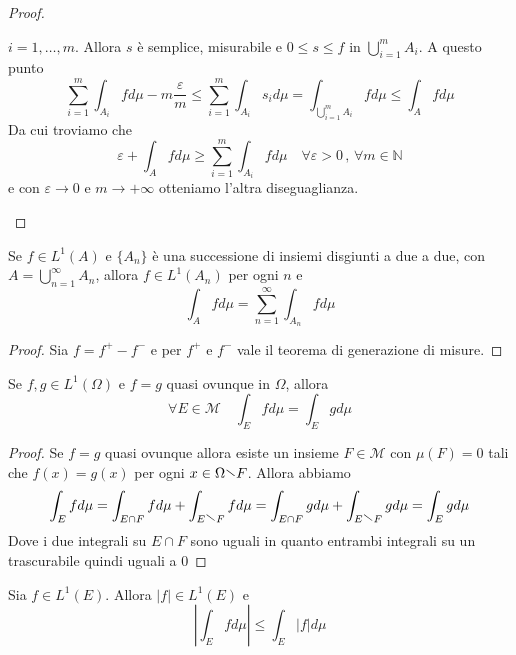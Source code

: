 \begin{proof}
\begin{enumerate}[label = \arabic*.]
            \(i = 1, \dots, m\). Allora \(s\) è semplice, misurabile e \(0 \le s
            \le f\) in \(\bigcup_{i=1}^{m} A_{i} \). A questo punto
            \[
                \sum_{i=1}^{m} \int_{A_{i}} f d\mu  - m \frac{\varepsilon}{m}
                \le   \sum_{i=1}^m \int_{A_{i}} s_{i} d\mu =
                \int_{\bigcup_{i=1}^{m} A_{i} } f d\mu \le \int_{A} f d\mu
            \]
            Da cui troviamo che 
            \[
                \varepsilon + \int_{A} f d\mu \ge \sum_{i=1}^{m} \int_{A_{i}} f
                d\mu \quad \forall \varepsilon >0 \,,\, \forall m \in \mathbb{N}
            \]
            e con \(\varepsilon \to 0 \) e \(m \to +\infty\) otteniamo l'altra
            diseguaglianza.
    \end{enumerate}
\end{proof}
\begin{corollary}
    Se \(f \in L^{1}(A)\) e \(\{A_{n}\}\) è una successione di insiemi
    disgiunti a due a due, con \(A = \bigcup_{n=1}^{\infty} A_{n} \), allora \(f
    \in L^{1}(A_n)\) per ogni \(n\) e
    \[
        \int_{A} f d\mu = \sum_{n=1}^{\infty}
        \int_{A_{n}} f d\mu
    \]
\end{corollary}
\begin{proof}
    Sia \(f = f^{+} - f^{-}\) e per \(f^{+}\) e \(f^{-}\) vale il teorema di
    generazione di misure.
\end{proof}
\begin{corollary}
    Se \(f, g \in L^{1} (\Omega)\) e \(f = g\) quasi ovunque in \(\Omega\),
    allora \[\forall E \in \mathcal{M} \quad \int_{E} f d\mu = \int_{E} g d\mu\]
\end{corollary}
\begin{proof}
    Se \(f=g\) quasi ovunque allora esiste un insieme \(F \in \mathcal{M}\) con
    \(\mu(F) = 0\) tali che \(f(x) = g(x)\) per ogni \(x \in \Omega \sminus F\).
    Allora abbiamo
    \[
        \int_{E} f d\mu = \int_{E \cap F} f d\mu + \int_{E \sminus F} f d\mu =
        \int_{E \cap F} g d\mu + \int_{E \sminus F} g d\mu = \int_{E} g d\mu
    \]
    Dove i due integrali su \(E \cap F\) sono uguali in quanto entrambi
    integrali su un trascurabile quindi uguali a 0
\end{proof}
\begin{proposition}
    Sia \(f \in L^{1}(E)\). Allora \(|f| \in L^{1}(E)\) e
    \[
        \left| \int_{E} f d\mu \right| \le \int_{E} |f| d\mu
    \]
\end{proposition}
